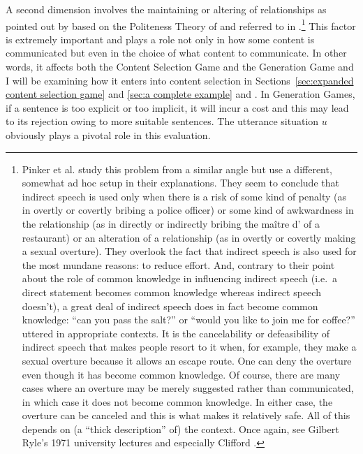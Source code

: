 A second dimension involves the maintaining or altering of relationships as pointed out by \cite{pnl:lis} based on the Politeness Theory of \citet{bl:p} and referred to in .\footnote{Pinker et al. study this problem from a similar angle but use a different, somewhat ad hoc setup in their explanations. They seem to conclude that indirect speech is used only when there is a risk of some kind of penalty (as in overtly or covertly bribing a police officer) or some kind of awkwardness in the relationship (as in directly or indirectly bribing the ma\^{i}tre d' of a restaurant) or an alteration of a relationship (as in overtly or covertly making a sexual overture). They overlook the fact that indirect speech is also used for the most mundane reasons: to reduce effort. And, contrary to their point about the role of common knowledge in influencing indirect speech (i.e.\ a direct statement becomes common knowledge whereas indirect speech doesn't), a great deal of indirect speech does in fact become common knowledge: ``can you pass the salt?'' or ``would you like to join me for coffee?'' uttered in appropriate contexts. It is the cancelability or defeasibility of indirect speech that makes people resort to it when, for example, they make a sexual overture because it allows an escape route. One can deny the overture even though it has become common knowledge. Of course, there are many cases where an overture may be merely suggested rather than communicated, in which case it does not become common knowledge. In either case, the overture can be canceled and this is what makes it relatively safe. All of this depends on (a ``thick description'' of) the context. Once again, see Gilbert Ryle's 1971 university lectures and especially Clifford \citet{geertz:ic}.} This factor is extremely important and plays a role not only in how some content is communicated but even in the choice of what content to communicate. In other words, it affects both the Content Selection Game and the Generation Game and I will be examining how it enters into content selection in Sections~\ref{sec:expanded content selection game} and \ref{sec:a complete example} and . In Generation Games, if a sentence is too explicit or too implicit, it will incur a cost and this may lead to its rejection owing to more suitable sentences. The utterance situation $u$ obviously plays a pivotal role in this evaluation.

